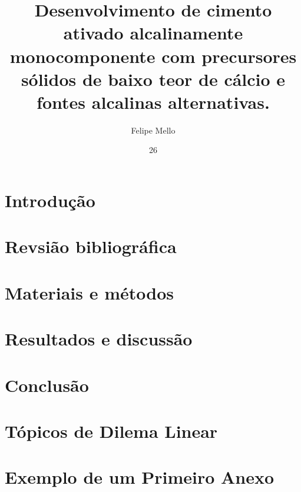 \documentclass[tg]{ita}    %
\author{Felipe Mello}{dos Reis}
\title{Desenvolvimento de cimento ativado alcalinamente monocomponente com
precursores sólidos de baixo teor de cálcio e fontes alcalinas alternativas.}
\date{26}{maio}{2025}
\begin{document}


\mainmatter

\chapter{Introdução}


\chapter{Revsião bibliográfica}


\chapter{Materiais e métodos}


\chapter{Resultados e discussão}


\chapter{Conclusão}


\renewcommand\bibname{\itareferencesnamebabel} %


\appendix
\chapter{Tópicos de Dilema Linear} %


\annex
\chapter{Exemplo de um Primeiro Anexo} %


\end{document}
